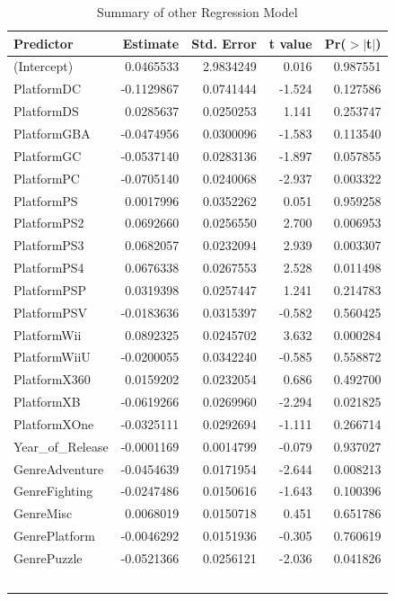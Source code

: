\documentclass[12pt]{article}
\begin{document}
\begin{table}[ht]
  \caption{Summary of other Regression Model}
  \label{tab:other}
\centering
\begin{tabular}{lrrrr}
\hline
Predictor & Estimate & Std. Error & t value & Pr($>$$|$t$|$) \\ 
\hline
(Intercept) & 0.0465533 & 2.9834249 & 0.016 & 0.987551  \\
PlatformDC & -0.1129867 & 0.0741444 & -1.524 & 0.127586  \\
PlatformDS & 0.0285637 & 0.0250253 & 1.141 & 0.253747  \\
PlatformGBA & -0.0474956 & 0.0300096 & -1.583 & 0.113540  \\
PlatformGC & -0.0537140 & 0.0283136 & -1.897 & 0.057855   \\
PlatformPC & -0.0705140 & 0.0240068 & -2.937 & 0.003322   \\
PlatformPS & 0.0017996 & 0.0352262 & 0.051 & 0.959258  \\
PlatformPS2 & 0.0692660 & 0.0256550 & 2.700 & 0.006953   \\
PlatformPS3 & 0.0682057 & 0.0232094 & 2.939 & 0.003307   \\
PlatformPS4 & 0.0676338 & 0.0267553 & 2.528 & 0.011498   \\
PlatformPSP & 0.0319398 & 0.0257447 & 1.241 & 0.214783  \\
PlatformPSV & -0.0183636 & 0.0315397 & -0.582 & 0.560425  \\
PlatformWii & 0.0892325 & 0.0245702 & 3.632 & 0.000284   \\
PlatformWiiU & -0.0200055 & 0.0342240 & -0.585 & 0.558872  \\
PlatformX360 & 0.0159202 & 0.0232054 & 0.686 & 0.492700  \\
PlatformXB & -0.0619266 & 0.0269960 & -2.294 & 0.021825   \\
PlatformXOne & -0.0325111 & 0.0292694 & -1.111 & 0.266714  \\
Year\_of\_Release & -0.0001169 & 0.0014799 & -0.079 & 0.937027  \\
GenreAdventure & -0.0454639 & 0.0171954 & -2.644 & 0.008213   \\
GenreFighting & -0.0247486 & 0.0150616 & -1.643 & 0.100396  \\
GenreMisc & 0.0068019 & 0.0150718 & 0.451 & 0.651786  \\
GenrePlatform & -0.0046292 & 0.0151936 & -0.305 & 0.760619  \\
GenrePuzzle & -0.0521366 & 0.0256121 & -2.036 & 0.041826   \\
$$
\end{tabular}
\end{table}
\end{document}
